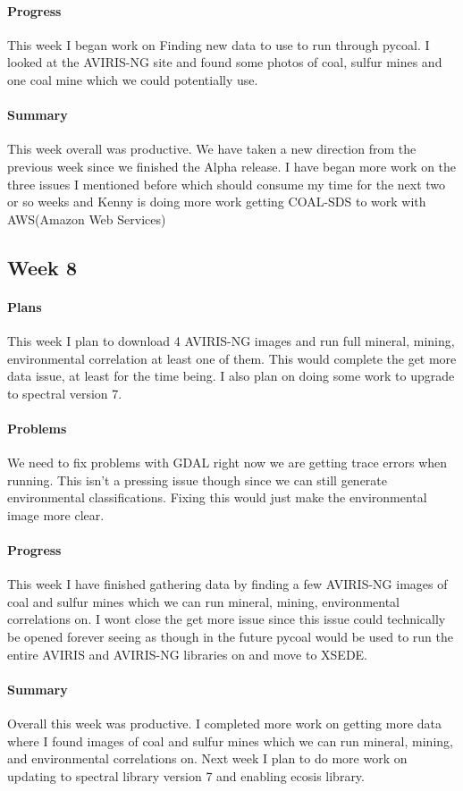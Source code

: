 \documentclass{article}
\begin{document}
\paragraph{Progress}
This week I began work on Finding new data to use to run through pycoal. I looked at the AVIRIS-NG site and found some photos of coal, sulfur mines and one coal mine which we could potentially use. 
\paragraph{Summary}
 This week overall was productive. We have taken a new direction from the previous week since we finished the Alpha release. I have began more work on the three issues I mentioned before which should consume my time for the next two or so weeks and Kenny is doing more work getting COAL-SDS to work with AWS(Amazon Web Services)
\subsection{Week 8}
\paragraph{Plans}
This week I plan to download 4 AVIRIS-NG images and run full mineral, mining, environmental correlation at least one of them. This would complete the get more data issue, at least for the time being. I also plan on doing some work to upgrade to spectral version 7.
\paragraph{Problems}
We need to fix problems with GDAL right now we are getting trace errors when running. This isn't a pressing issue though since we can still generate environmental classifications. Fixing this would just make the environmental image more clear. 
\paragraph{Progress}
This week I have finished gathering data by finding a few AVIRIS-NG images of coal and sulfur mines which we can run mineral, mining, environmental correlations on. I wont close the get more issue since this issue could technically be opened forever seeing as though in the future pycoal would be used to run the entire AVIRIS and AVIRIS-NG libraries on and move to XSEDE.
\paragraph{Summary}
Overall this week was productive. I completed more work on getting more data where I found  images of coal and sulfur mines which we can run mineral, mining, and environmental correlations on. Next week I plan to do more work on updating to spectral library version 7 and enabling ecosis library.
\end{document}
